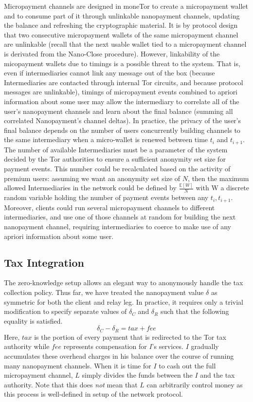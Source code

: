 Micropayment channels are designed in moneTor to create a micropayment wallet
and to consume part of it through unlinkable nanopayment channels, updating the
balance and refreshing the cryptographic material. It is by protocol design that
two consecutive micropayment wallets of the same micropayment channel are
unlinkable (recall that the next usable wallet tied to a micropayment channel is
derivated from the Nano-Close procedure). However, linkability of the
micopayment wallets due to timings is a possible threat to the system. That is,
even if intermediaries cannot link any message out of the box (because
Intermediaries are contacted through internal Tor circuits, and because protocol
messages are unlinkable), timings of micropayment events combined to apriori
information about some user may allow the intermediary to correlate all of the
user's nanopayment channels and learn about the final balance (summing all
correlated Nanopayment's channel deltas). In practice, the privacy of the user's
final balance depends on the number of users concurrently building channels to
the same intermediary when a micro-wallet is renewed between time $t_i$ and
$t_{i+1}$. The number of available Intermediaries must be a parameter of the
system decided by the Tor authorities to ensure a sufficient anonymity set size
for payment events. This number could be recalculated based on the activity of
premium users: assuming we want an anonymity set size of $N$, then the maximum
allowed Intermediaries in the network could be defined by
$\frac{\mathbb{E}[W]}{N}$ with W a discrete random variable holding the number
of payment events between any $t_i, t_{i+1}$. Moreover, clients could run
several micropayment channels to different intermediaries, and use one of those
channels at random for building the next nanopayment channel, requiring
intermediaries to coerce to make use of any apriori information about some user.

\subsection{Tax Integration}

The zero-knowledge setup allows an elegant way to anonymously handle the tax
collection policy. Thus far, we have treated the nanopayment value $\delta$ as
symmetric for both the client and relay leg. In practice, it requires only a
trivial modification to specify separate values of $\delta_C$ and $\delta_R$
such that the following equality is satisfied.
\begin{equation}
  \delta_C - \delta_R = tax + fee
  \label{eq:payment}
\end{equation}
Here, $tax$ is the portion of every payment that is redirected to the Tor tax
authority while $fee$ represents compensation for $I$'s services. $I$ gradually
accumulates these overhead charges in his balance over the course of running
many nanopayment channels. When it is time for $I$ to cash out the full
micropayment channel, $L$ simply divides the funds between the $I$ and the tax
authority. Note that this does \emph{not} mean that $L$ can arbitrarily control
money as this process is well-defined in setup of the network protocol.

